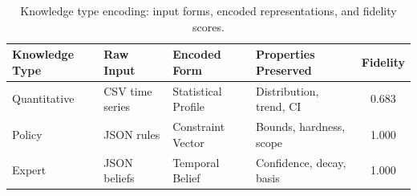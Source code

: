 \begin{table}[ht]
\centering
\caption{Knowledge type encoding: input forms, encoded representations, and fidelity scores.}
\label{tab:encoding}
\small
\begin{tabular}{llll c}
\toprule
\textbf{Knowledge Type} & \textbf{Raw Input} & \textbf{Encoded Form} & \textbf{Properties Preserved} & \textbf{Fidelity} \\
\midrule
Quantitative & CSV time series & Statistical Profile & Distribution, trend, CI & 0.683 \\
Policy & JSON rules & Constraint Vector & Bounds, hardness, scope & 1.000 \\
Expert & JSON beliefs & Temporal Belief & Confidence, decay, basis & 1.000 \\
\bottomrule
\end{tabular}
\end{table}